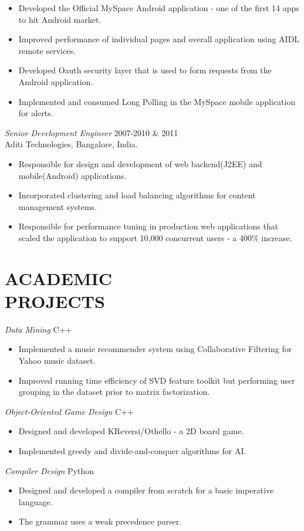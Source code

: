 \documentclass[line,margin]{res}
\begin{document}
\begin{resume}
\begin{itemize}
			\item Developed the Official MySpace Android application - one of the first 14 apps to hit Android market.
			\item Improved performance of individual pages and overall application using AIDL
			remote services.
			\item Developed Oauth security layer that is used to form requests from the Android application. 
			\item Implemented and consumed Long Polling in the MySpace mobile application for alerts.
		\end{itemize} 
		{\sl Senior Development Engineer} \hfill        2007-2010 \& 2011 \\
		Aditi Technologies, Bangalore, India.
		\begin{itemize}     \itemsep -2pt
			\item Responsible for design and development of web backend(J2EE) and mobile(Android) applications.
			\item Incorporated clustering and load balancing algorithms for content management systems.
			\item Responsible for performance tuning in production web applications that scaled the application to support 10,000 concurrent users - a 400\% increase.
		\end{itemize} 
		
		
		\section{ACADEMIC \\ PROJECTS}  {\sl Data Mining} \hfill        C++
		\begin{itemize}  \itemsep -2pt %
			\item Implemented a music recommender system using Collaborative Filtering for Yahoo music dataset.
			\item Improved running time efficiency of SVD feature toolkit but performing user grouping in the dataset prior to matrix factorization.
		\end{itemize} 
		{\sl Object-Oriented Game Design}  \hfill        C++
		\begin{itemize} \itemsep -2pt
			\item Designed and developed KReversi/Othello - a 2D board game.
			\item Implemented greedy and divide-and-conquer algorithms for AI.
		\end{itemize} 
		{\sl Compiler Design}  \hfill        Python
		\begin{itemize} \itemsep -2pt
			\item Designed and developed a compiler from scratch for a basic imperative language.
			\item The grammar uses a weak precedence parser.       
		\end{itemize}
		

\end{resume}
\end{document}
